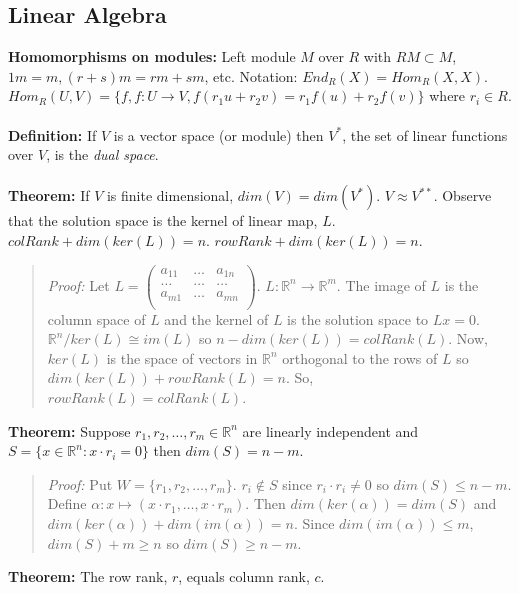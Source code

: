 \subsection{Linear Algebra}
{\bf Homomorphisms on modules:}
Left module $M$ over $R$ with $RM \subset M$, $1 m = m, (r+s)m=rm+sm$, etc.
Notation: $End_R(X)= Hom_R(X,X)$.
$Hom_R(U,V)= \{ f, f:U \rightarrow V, 
f(r_1 u + r_2 v)= r_1 f(u) + r_2 f(v) \}$ where $r_i \in R$.
\\
\\
{\bf Definition:} 
If $V$ is a vector space (or module) then $V^*$, the set of linear functions over $V$, 
is the \emph{dual space}.  
\\
\\
{\bf Theorem:}
If $V$ is finite dimensional, $dim(V)= dim(V^*)$.  $V \approx V^{**}$.  
Observe that the solution space is the
kernel of linear map, $L$. 
$colRank + dim(ker(L))=n$.  $rowRank + dim(ker(L))=n$.
\begin{quote}
\emph{Proof:} Let
$L = 
\left(
\begin{array}{ccc}
a_{11} & \ldots & a_{1n}\\
\ldots & \ldots & \ldots\\
a_{m1} & \ldots & a_{mn}\\
\end{array}
\right)$.  $L: {\mathbb R}^n \rightarrow {\mathbb R}^m$.  The image of $L$ is the column
space of $L$ and the kernel of $L$ is the solution space to $Lx = 0$.
${\mathbb R}^n / ker(L) \cong im(L)$ so $n - dim(ker(L)) = colRank(L)$.
Now, $ker(L)$ is the space of vectors in ${\mathbb R}^n$ orthogonal to the
rows of $L$ so $dim(ker(L)) + rowRank(L) = n$. So, $rowRank(L) = colRank(L)$.
\end{quote}
{\bf Theorem:}   Suppose $r_1, r_2 , \ldots , r_m \in {\mathbb R}^n$ are linearly independent and
$S= \{ x \in {\mathbb R}^n: x \cdot r_i=0 \}$ then $dim(S)=n-m$.
\begin{quote}
\emph{Proof:}  Put $W= \{ r_1, r_2, \ldots , r_m \}$.
$r_i \notin S$ since $r_i \cdot r_i \ne 0$ so $dim(S) \le n-m$.  Define $\alpha: x \mapsto
(x \cdot r_1, \ldots , x \cdot r_m)$.  Then $dim(ker(\alpha)) = dim(S)$ and
$dim(ker(\alpha)) + dim(im(\alpha)) =n$.  Since $dim(im(\alpha)) \le m$, $dim(S) + m \ge n$ so
$dim(S) \ge n-m$.
\end{quote}
{\bf Theorem:} The row rank, $r$, equals column rank, $c$. 
